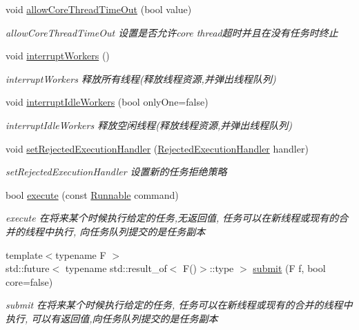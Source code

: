 \begin{DoxyCompactItemize}
void \hyperlink{classThreadPoolExecutor_aa700bdf61ac6f9a67411560af2871ee7}{allow\+Core\+Thread\+Time\+Out} (bool value)
\begin{DoxyCompactList}\small\item\em allow\+Core\+Thread\+Time\+Out 设置是否允许core thread超时并且在没有任务时终止 \end{DoxyCompactList}\item 
\mbox{\label{classThreadPoolExecutor_aad69159d8b4aa6b5a2ff042e392be456}} 
void \hyperlink{classThreadPoolExecutor_aad69159d8b4aa6b5a2ff042e392be456}{interrupt\+Workers} ()
\begin{DoxyCompactList}\small\item\em interrupt\+Workers 释放所有线程(释放线程资源,并弹出线程队列) \end{DoxyCompactList}\item 
void \hyperlink{classThreadPoolExecutor_a83bf8bbd11a4dfe12b843dac846a825d}{interrupt\+Idle\+Workers} (bool only\+One=false)
\begin{DoxyCompactList}\small\item\em interrupt\+Idle\+Workers 释放空闲线程(释放线程资源,并弹出线程队列) \end{DoxyCompactList}\item 
void \hyperlink{classThreadPoolExecutor_ab04e6a91b39073eaafffa8fc22eae325}{set\+Rejected\+Execution\+Handler} (\hyperlink{classRejectedExecutionHandler}{Rejected\+Execution\+Handler} handler)
\begin{DoxyCompactList}\small\item\em set\+Rejected\+Execution\+Handler 设置新的任务拒绝策略 \end{DoxyCompactList}\item 
bool \hyperlink{classThreadPoolExecutor_a04e334b5d7f3b383aa01fbac80120feb}{execute} (const \hyperlink{classRunnable}{Runnable} command)
\begin{DoxyCompactList}\small\item\em execute 在将来某个时候执行给定的任务,无返回值, 任务可以在新线程或现有的合并的线程中执行, 向任务队列提交的是任务副本 \end{DoxyCompactList}\item 
{\footnotesize template$<$typename F $>$ }\\std\+::future$<$ typename std\+::result\+\_\+of$<$ F()$>$\+::type $>$ \hyperlink{classThreadPoolExecutor_aaaef92fe45f7f5a8b659187c15881ca3}{submit} (F f, bool core=false)
\begin{DoxyCompactList}\small\item\em submit 在将来某个时候执行给定的任务, 任务可以在新线程或现有的合并的线程中执行, 可以有返回值,向任务队列提交的是任务副本 \end{DoxyCompactList}\item 

\end{DoxyCompactItemize}
